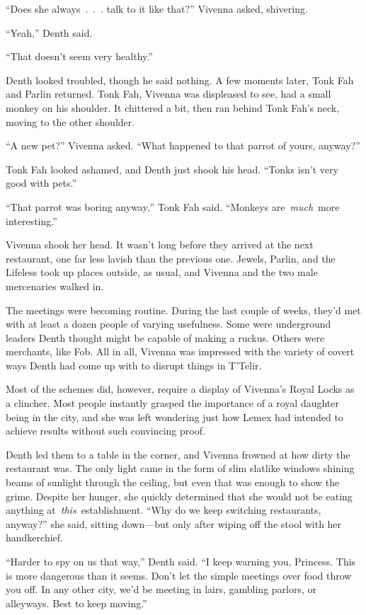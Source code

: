 “Does she always~.~.~. talk to it like that?” Vivenna asked, shivering.

“Yeah,” Denth said.

“That doesn’t seem very healthy.”

Denth looked troubled, though he said nothing. A few moments later, Tonk Fah and Parlin returned. Tonk Fah, Vivenna was displeased to see, had a small monkey on his shoulder. It chittered a bit, then ran behind Tonk Fah’s neck, moving to the other shoulder.

“A new pet?” Vivenna asked. “What happened to that parrot of yours, anyway?”

Tonk Fah looked ashamed, and Denth just shook his head. “Tonks isn’t very good with pets.”

“That parrot was boring anyway,” Tonk Fah said. “Monkeys are~\textit{much}~more interesting.”

Vivenna shook her head. It wasn’t long before they arrived at the next restaurant, one far less lavish than the previous one. Jewels, Parlin, and the Lifeless took up places outside, as usual, and Vivenna and the two male mercenaries walked in.

The meetings were becoming routine. During the last couple of weeks, they’d met with at least a dozen people of varying usefulness. Some were underground leaders Denth thought might be capable of making a ruckus. Others were merchants, like Fob. All in all, Vivenna was impressed with the variety of covert ways Denth had come up with to disrupt things in T’Telir.

Most of the schemes did, however, require a display of Vivenna’s Royal Locks as a clincher. Most people instantly grasped the importance of a royal daughter being in the city, and she was left wondering just how Lemex had intended to achieve results without such convincing proof.

Denth led them to a table in the corner, and Vivenna frowned at how dirty the restaurant was. The only light came in the form of slim slatlike windows shining beams of sunlight through the ceiling, but even that was enough to show the grime. Despite her hunger, she quickly determined that she would not be eating anything at~\textit{this}~establishment. “Why do we keep switching restaurants, anyway?” she said, sitting down—but only after wiping off the stool with her handkerchief.

“Harder to spy on us that way,” Denth said. “I keep warning you, Princess. This is more dangerous than it seems. Don’t let the simple meetings over food throw you off. In any other city, we’d be meeting in lairs, gambling parlors, or alleyways. Best to keep moving.”

